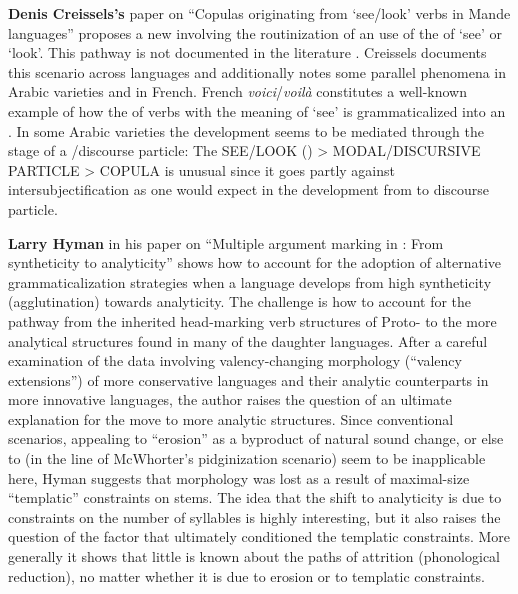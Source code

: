 \documentclass[output=paper]{LSP/langsci}
\begin{document}
\textbf{Denis Creissels’s} paper on “Copulas originating from ‘see/look’ verbs in Man\-de languages” proposes a new  involving the routinization of an  use of the  of ‘see’ or ‘look’. This pathway is not documented in the literature  \citep{Heine2002}. Creissels documents this scenario across  languages and additionally notes some parallel phenomena in Arabic varieties and in French. French \textit{voici}/\textit{voilà} constitutes a well-known example of how the  of verbs with the meaning of ‘see’ is grammaticalized into an  . In some Arabic varieties the development seems to be mediated through the stage of a /discourse particle: The  SEE/LOOK () > MODAL/DISCURSIVE PARTICLE > COPULA is unusual since it goes partly against intersubjectification as one would expect in the development from  to discourse particle. 

\textbf{Larry Hyman} in his paper on “Multiple argument marking in : From syntheticity to analyticity” shows how to account for the adoption of alternative grammaticalization strategies when a language develops from high syntheticity (agglutination) towards analyticity. The challenge is how to account for the pathway from the inherited head-marking verb structures of Proto- to the more analytical structures found in many of the daughter languages. After a careful examination of the data involving valency-changing morphology (“valency extensions”) of more conservative  languages and their analytic counterparts in more innovative  languages, the author raises the question of an ultimate explanation for the move to more analytic structures. Since conventional scenarios, appealing to “erosion” as a byproduct of natural sound change, or else to  (in the line of McWhorter’s pidginization scenario) seem to be inapplicable here, Hyman suggests that morphology was lost as a result of maximal-size “templatic” constraints on stems. The idea that the shift to analyticity is due to constraints on the number of syllables is highly interesting, but it also raises the question of the factor that ultimately conditioned the templatic constraints. More generally it shows that little is known about the paths of attrition (phonological reduction), no matter whether it is due to erosion or to templatic constraints.
\end{document}
